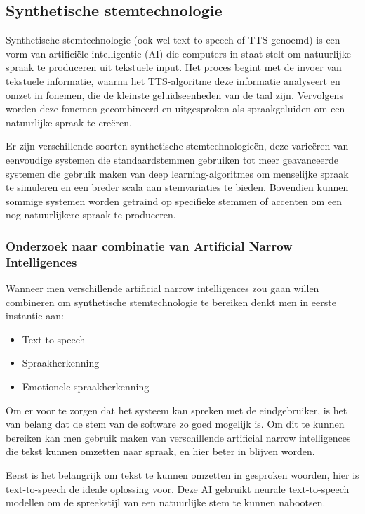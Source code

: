 \subsection{Synthetische stemtechnologie}

Synthetische stemtechnologie (ook wel text-to-speech of TTS genoemd) is een vorm van artificiële intelligentie (AI) die computers in staat stelt om natuurlijke spraak te produceren uit tekstuele input. Het proces begint met de invoer van tekstuele informatie, waarna het TTS-algoritme deze informatie analyseert en omzet in fonemen, die de kleinste geluidseenheden van de taal zijn. Vervolgens worden deze fonemen gecombineerd en uitgesproken als spraakgeluiden om een natuurlijke spraak te creëren.

Er zijn verschillende soorten synthetische stemtechnologieën, deze varieëren van eenvoudige systemen die standaardstemmen gebruiken tot meer geavanceerde systemen die gebruik maken van deep learning-algoritmes om menselijke spraak te simuleren en een breder scala aan stemvariaties te bieden. Bovendien kunnen sommige systemen worden getraind op specifieke stemmen of accenten om een nog natuurlijkere spraak te produceren.

\subsubsection{Onderzoek naar combinatie van Artificial Narrow Intelligences}

Wanneer men verschillende artificial narrow intelligences zou gaan willen combineren om synthetische stemtechnologie te bereiken denkt men in eerste instantie aan:

\begin{itemize}
    \item Text-to-speech
    \item Spraakherkenning
    \item Emotionele spraakherkenning
\end{itemize}

Om er voor te zorgen dat het systeem kan spreken met de eindgebruiker, is het van belang dat de stem van de software zo goed mogelijk is. Om dit te kunnen bereiken kan men gebruik maken van verschillende artificial narrow intelligences die tekst kunnen omzetten naar spraak, en hier beter in blijven worden.

Eerst is het belangrijk om tekst te kunnen omzetten in gesproken woorden, hier is text-to-speech de ideale oplossing voor. Deze AI gebruikt neurale text-to-speech modellen om de spreekstijl van een natuurlijke stem te kunnen nabootsen. 

